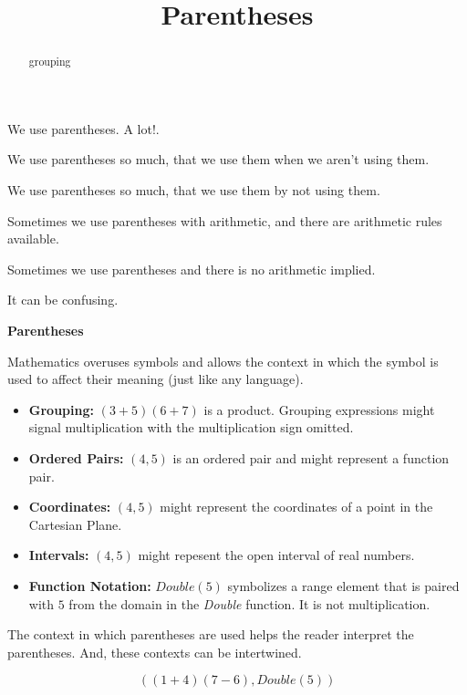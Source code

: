 \documentclass{ximera}
\title{Parentheses}
\begin{document}
\begin{abstract}
grouping
\end{abstract}
\maketitle



We use parentheses. A lot!. 

We use parentheses so much, that we use them when we aren't using them. 

We use parentheses so much, that we use them by not using them. 

Sometimes we use parentheses with arithmetic, and there are arithmetic rules available. 

Sometimes we use parentheses and there is no arithmetic implied. 


It can be confusing. 









\begin{notation}  \textbf{\textcolor{red!50!green}{Parentheses}}  

Mathematics overuses symbols and allows the context in which the symbol is used to affect their meaning (just like any language).
  \begin{itemize}
    \item \textbf{Grouping:} $(3+5)(6+7)$ is a product.  Grouping expressions might signal multiplication with the multiplication sign omitted.
    \item \textbf{Ordered Pairs:} $(4, 5)$ is an ordered pair and might represent a function pair.
    \item \textbf{Coordinates:} $(4, 5)$ might represent the coordinates of a point in the Cartesian Plane.
    \item \textbf{Intervals:} $(4, 5)$ might repesent the open interval of real numbers.
    \item \textbf{Function Notation:} $Double(5)$ symbolizes a range element that is paired with $5$ from the domain in the \textit{Double} function. It is not multiplication.
  \end{itemize}


The context in which parentheses are used helps the reader interpret the parentheses.  And, these contexts can be intertwined.

\[  ((1+4)(7-6), Double(5))    \]
\end{notation}
\end{document}
